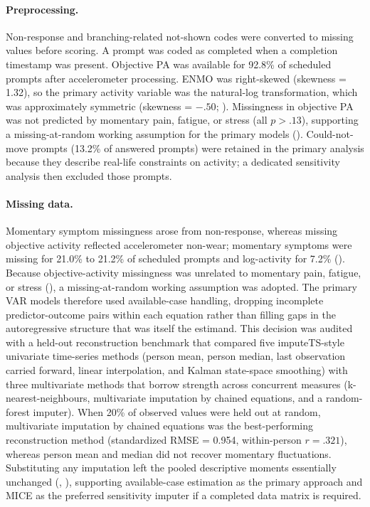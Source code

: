 \documentclass[11pt,a4paper]{article}
\begin{document}
\paragraph{Preprocessing.} Non-response and branching-related not-shown
codes were converted to missing values before scoring. A prompt was coded as completed when
a completion timestamp was present. Objective PA was available for 92.8\% of scheduled
prompts after accelerometer processing. ENMO was right-skewed (skewness = 1.32), so the
primary activity variable was the natural-log transformation, which was approximately
symmetric (skewness = $-.50$; ). Missingness in objective PA was not
predicted by momentary pain, fatigue, or stress (all $p>.13$), supporting a
missing-at-random working assumption for the primary models ().
Could-not-move prompts (13.2\% of answered prompts) were retained in the primary analysis
because they describe real-life constraints on activity; a dedicated sensitivity analysis
then excluded those prompts.

\paragraph{Missing data.} Momentary symptom missingness arose from non-response, whereas
missing objective activity reflected accelerometer non-wear; momentary symptoms were missing
for 21.0\% to 21.2\% of scheduled prompts and log-activity for 7.2\%
(). Because objective-activity missingness was unrelated to
momentary pain, fatigue, or stress (), a missing-at-random working
assumption was adopted. The primary VAR models therefore used available-case handling,
dropping incomplete predictor-outcome pairs within each equation rather than filling gaps in
the autoregressive structure that was itself the estimand. This decision was audited with a
held-out reconstruction benchmark that compared five imputeTS-style univariate time-series
methods \citep{moritz2017imputets} (person mean, person median, last observation carried
forward, linear interpolation, and Kalman state-space smoothing) with three multivariate
methods that borrow strength across concurrent measures (k-nearest-neighbours, multivariate
imputation by chained equations, and a random-forest imputer). When 20\% of observed values
were held out at random, multivariate imputation by chained equations was the best-performing
reconstruction method (standardized RMSE = 0.954, within-person $r=.321$), whereas person
mean and median did not recover momentary fluctuations. Substituting any imputation left the
pooled descriptive moments essentially unchanged (,
), supporting available-case estimation as the primary approach and
MICE as the preferred sensitivity imputer if a completed data matrix is required.
\end{document}
